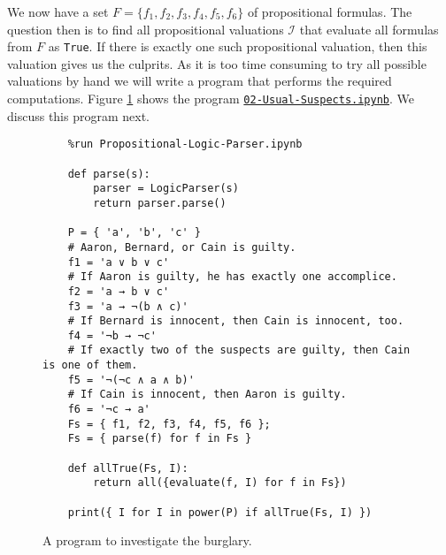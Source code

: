 We now have a set $F = \{ f_1, f_2, f_3, f_4, f_5, f_6 \}$ of propositional formulas.
The question then is to find all propositional valuations $\mathcal{I}$ that evaluate all formulas from $F$ as
\texttt{True}.  If there is exactly one such propositional valuation, then this valuation gives us the culprits.
As it is too time consuming to try all possible valuations by hand we will write a program that performs the
required computations.
Figure \ref{fig:Usual-Suspects.ipynb} shows the program
\href{https://github.com/karlstroetmann/Logic/blob/master/Python/Chapter-4/02-Usual-Suspects.ipynb}{\texttt{02-Usual-Suspects.ipynb}}.
We discuss this program next.

\begin{figure}[!ht]
  \centering
\begin{verbatim}
    %run Propositional-Logic-Parser.ipynb

    def parse(s):
        parser = LogicParser(s) 
        return parser.parse()   
    
    P = { 'a', 'b', 'c' }
    # Aaron, Bernard, or Cain is guilty.
    f1 = 'a ∨ b ∨ c'
    # If Aaron is guilty, he has exactly one accomplice.
    f2 = 'a → b ∨ c'
    f3 = 'a → ¬(b ∧ c)'
    # If Bernard is innocent, then Cain is innocent, too.
    f4 = '¬b → ¬c'
    # If exactly two of the suspects are guilty, then Cain is one of them.
    f5 = '¬(¬c ∧ a ∧ b)'
    # If Cain is innocent, then Aaron is guilty.
    f6 = '¬c → a'
    Fs = { f1, f2, f3, f4, f5, f6 };
    Fs = { parse(f) for f in Fs }

    def allTrue(Fs, I):
        return all({evaluate(f, I) for f in Fs})

    print({ I for I in power(P) if allTrue(Fs, I) })
\end{verbatim}
\vspace*{-0.3cm}
  \caption{A program to investigate the burglary.}
  \label{fig:Usual-Suspects.ipynb}
\end{figure}

